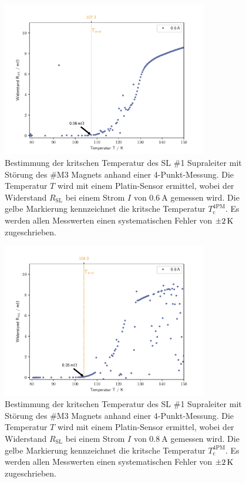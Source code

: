 \begin{figure}[H]
    \centering
    \includegraphics[width=0.8\textwidth]{Auswertung/I_krit_Pt_b/R_T_0.6A.pdf}
    \caption{Bestimmung der kritschen Temperatur des SL \#1 Supraleiter mit
    Störung des \#M3 Magnets anhand einer 4-Punkt-Messung. Die Temperatur $T$
    wird mit einem Platin-Sensor
    ermittel, wobei der Widerstand $R_{\text{SL}}$ bei einem Strom $I$ von
    $\SI{0.6}{\ampere}$ gemessen wird.
		Die gelbe Markierung kennzeichnet die kritsche Temperatur	$T^{\text{4PM}}_{\text{c}}$.
		Es werden allen Messwerten einen systematischen Fehler von $\SI{\pm2}{\kelvin}$
		zugeschrieben.}
    \label{fig:Tc2.1}
\end{figure}

\begin{figure}[H]
    \centering
    \includegraphics[width=0.8\textwidth]{Auswertung/I_krit_Pt_b/R_T_0.8A.pdf}
    \caption{Bestimmung der kritschen Temperatur des SL \#1 Supraleiter mit
    Störung des \#M3 Magnets anhand einer 4-Punkt-Messung. Die Temperatur $T$
    wird mit einem Platin-Sensor
    ermittel, wobei der Widerstand $R_{\text{SL}}$ bei einem Strom $I$ von
    $\SI{0.8}{\ampere}$ gemessen wird.
		Die gelbe Markierung kennzeichnet die kritsche Temperatur	$T^{\text{4PM}}_{\text{c}}$.
		Es werden allen Messwerten einen systematischen Fehler von $\SI{\pm2}{\kelvin}$
		zugeschrieben.}
    \label{fig:Tc2.2}
\end{figure}
